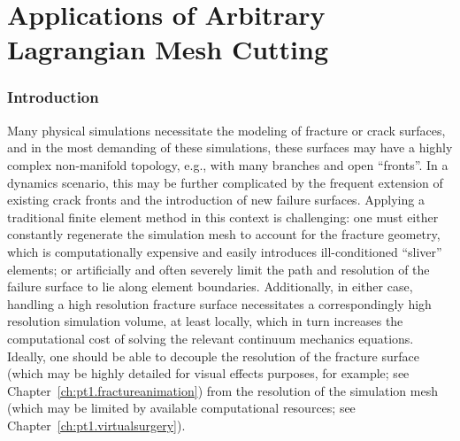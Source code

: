 %

\part{Applications of Arbitrary Lagrangian Mesh Cutting}

\renewcommand{\thechapter}{\thepart}

\section*{Introduction}

Many physical simulations necessitate the modeling of fracture or crack surfaces, and in the most demanding of these simulations, these surfaces may have a highly complex non-manifold topology, e.g., with many branches and open ``fronts''. In a dynamics scenario, this may be further complicated by the frequent extension of existing crack fronts and the introduction of new failure surfaces. Applying a traditional finite element method in this context is challenging: one must either constantly regenerate the simulation mesh to account for the fracture geometry, which is computationally expensive and easily introduces ill-conditioned ``sliver'' elements; or artificially and often severely limit the path and resolution of the failure surface to lie along element boundaries. Additionally, in either case, handling a high resolution fracture surface necessitates a correspondingly high resolution simulation volume, at least locally, which in turn increases the computational cost of solving the relevant continuum mechanics equations. Ideally, one should be able to decouple the resolution of the fracture surface (which may be highly detailed for visual effects purposes, for example; see Chapter~\ref{ch:pt1.fractureanimation}) from the resolution of the simulation mesh (which may be limited by available computational resources; see Chapter~\ref{ch:pt1.virtualsurgery}).

